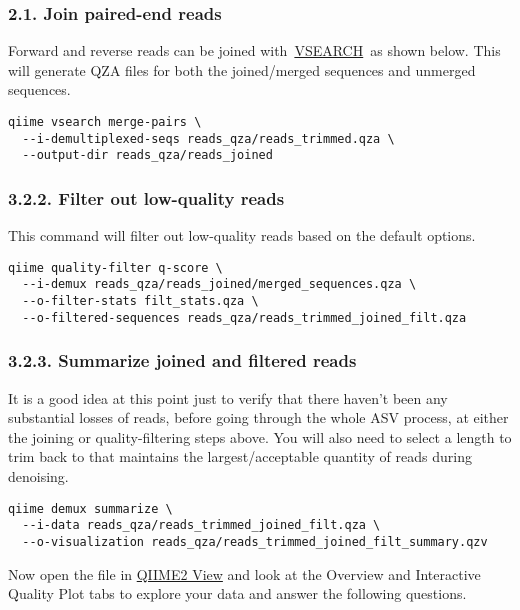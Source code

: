 \documentclass[
]{book}
\begin{document}
\subsubsection{2.1. Join paired-end reads}\label{join-paired-end-reads-2}

Forward and reverse reads can be joined with~\href{https://github.com/torognes/vsearch}{VSEARCH}~as shown below. This will generate QZA files for both the joined/merged sequences and unmerged sequences.

\begin{verbatim}
qiime vsearch merge-pairs \
  --i-demultiplexed-seqs reads_qza/reads_trimmed.qza \
  --output-dir reads_qza/reads_joined
\end{verbatim}

\subsubsection{3.2.2. Filter out low-quality reads}\label{filter-out-low-quality-reads-2}

This command will filter out low-quality reads based on the default options.

\begin{verbatim}
qiime quality-filter q-score \
  --i-demux reads_qza/reads_joined/merged_sequences.qza \
  --o-filter-stats filt_stats.qza \
  --o-filtered-sequences reads_qza/reads_trimmed_joined_filt.qza
\end{verbatim}

\subsubsection{3.2.3. Summarize joined and filtered reads}\label{summarize-joined-and-filtered-reads-2}

It is a good idea at this point just to verify that there haven't been any substantial losses of reads, before going through the whole ASV process, at either the joining or quality-filtering steps above. You will also need to select a length to trim back to that maintains the largest/acceptable quantity of reads during denoising.

\begin{verbatim}
qiime demux summarize \
  --i-data reads_qza/reads_trimmed_joined_filt.qza \
  --o-visualization reads_qza/reads_trimmed_joined_filt_summary.qzv
\end{verbatim}

Now open the file in \href{https://view.qiime2.org/}{QIIME2 View} and look at the Overview and Interactive Quality Plot tabs to explore your data and answer the following questions.
\end{document}
